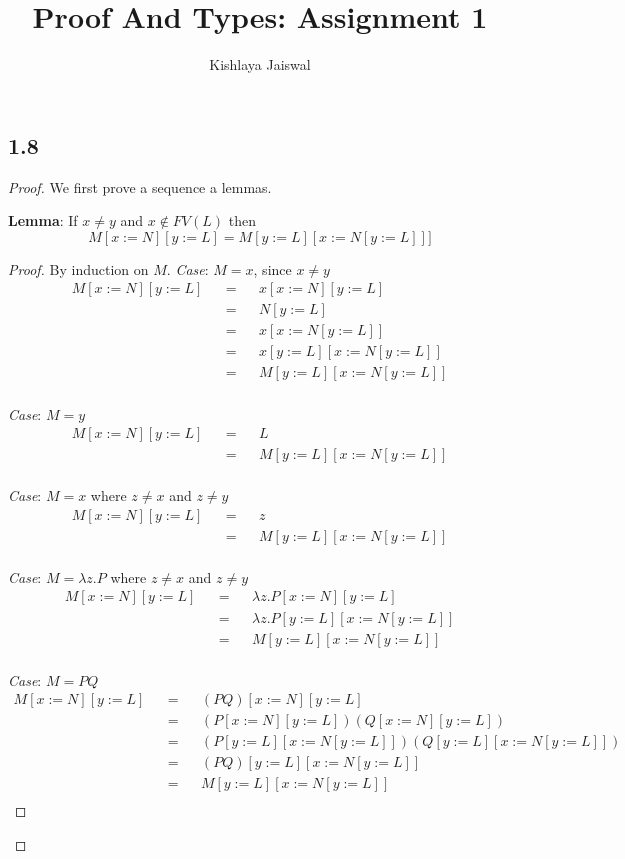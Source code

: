 \documentclass[12pt]{article}
\title{Proof And Types: Assignment 1}
\author{Kishlaya Jaiswal}
\begin{document}
\maketitle

\vspace{0.5in}

\subsection*{1.8}

\begin{proof}

We first prove a sequence a lemmas.

\textbf{Lemma}: If $x \neq y$ and $x \not \in FV(L)$ then $$M[x:=N][y:=L] = M[y:=L][x:=N[y:=L]]]$$

\begin{proof}
By induction on $M$.
\textsl{Case}: $M=x$, since $x \neq y$
\begin{align*}
    M[x:=N][y:=L] &&=&& x[x:=N][y:=L] \\
    &&=&& N[y:=L] \\
    &&=&& x[x:=N[y:=L]] \\
    &&=&& x[y:=L][x:=N[y:=L]] \\
    &&=&& M[y:=L][x:=N[y:=L]] \\
\end{align*}

\textsl{Case}: $M=y$
\begin{align*}
    M[x:=N][y:=L] &&=&& L \\
    &&=&& M[y:=L][x:=N[y:=L]] \\
\end{align*}

\textsl{Case}: $M=x$ where $z \neq x$ and $z \neq y$
\begin{align*}
    M[x:=N][y:=L] &&=&& z \\
    &&=&& M[y:=L][x:=N[y:=L]] \\
\end{align*}

\textsl{Case}: $M=\lambda z.P$ where $z \neq x$ and $z \neq y$
\begin{align*}
    M[x:=N][y:=L] &&=&& \lambda z.P[x:=N][y:=L] \\
    &&=&& \lambda z.P[y:=L][x:=N[y:=L]] \\
    &&=&& M[y:=L][x:=N[y:=L]] \\
\end{align*}

\textsl{Case}: $M = P Q$
\begin{align*}
    M[x:=N][y:=L] &&=&& (P Q)[x:=N][y:=L] \\
    &&=&& (P[x:=N][y:=L]) (Q[x:=N][y:=L]) \\
    &&=&& (P[y:=L][x:=N[y:=L]]) (Q[y:=L][x:=N[y:=L]]) \\
    &&=&& (P Q)[y:=L][x:=N[y:=L]] \\
    &&=&& M[y:=L][x:=N[y:=L]] \\
\end{align*}


\end{proof}
\end{proof}
\end{document}
